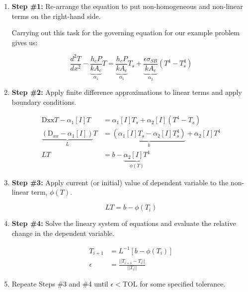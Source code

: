 \begin{enumerate}
\item \textbf{Step \#1:} Re-arrange the equation to put non-homogeneous and non-linear terms on the right-hand side.  

\vspace{0.25cm}

\noindent Carrying out this task for the governing equation for our example problem gives us:

\begin{equation*}
\frac{d^2 T}{dx^2} - \underbrace{\frac{h_c P}{k A_{c}}}_{\alpha_1}T = \underbrace{\frac{h_c P}{k A_c}}_{\alpha_1} T_s + \underbrace{\frac{\epsilon \sigma_{SB}}{kA_c}}_{\alpha_2}\left(T^4 - T_s^4 \right)
\end{equation*}

\item \textbf{Step \#2:} Apply finite difference approximations to linear terms and apply boundary conditions.

\begin{align*}
\text{Dxx}T - \alpha_1 \left[I\right] T &= \alpha_1 \left[I\right]T_s + \alpha_2 \left[I\right]\left(T^4-T_s\right) \\
\underbrace{\left(\text{D}_{xx} - \alpha_1\left[I\right]\right)}_{L}T &= \underbrace{\left(\alpha_1 \left[I\right]T_s - \alpha_2 \left[I\right]T_s^4\right)}_{b} + \alpha_2\left[I\right]T^4 \\
LT &= b - \underbrace{\alpha_2 \left[I\right]T^4}_{\phi(T)}
\end{align*}

\item \textbf{Step \#3:} Apply current (or initial) value of dependent variable to the non-linear term, $\phi(T)$. 

\begin{equation*}
LT = b - \phi(T_i)
\end{equation*}

\item \textbf{Step \#4:} Solve the lineary system of equations and evaluate the relative change in the dependent variable.

\begin{align*}
T_{i+1} &= L^{-1} \left[b - \phi(T_i)\right] \\
\epsilon &= \frac{||T_{i+1} - T_i||}{||T_i||}
\end{align*}

\item Repeate Steps \#3 and \#4 until $\epsilon < \text{TOL}$ for some specified tolerance.

\end{enumerate}
